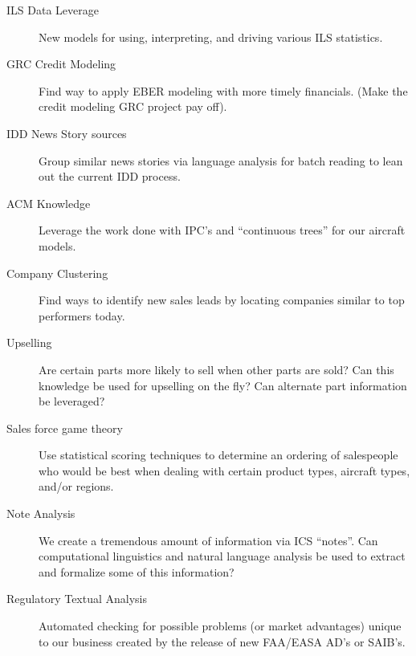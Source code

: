 \documentclass[letterpaper]{article}
\begin{document}
\begin{description}
    \item[ILS Data Leverage]
        New models for using, interpreting, and driving various ILS statistics.

    \item[GRC Credit Modeling]
        Find way to apply EBER modeling with more timely financials. (Make the
        credit modeling GRC project pay off).

    \item[IDD News Story sources]
        Group similar news stories via language analysis for batch reading to
        lean out the current IDD process.

    \item[ACM Knowledge]
        Leverage the work done with IPC's and ``continuous trees'' for our 
        aircraft models.

    \item[Company Clustering]
        Find ways to identify new sales leads by locating companies similar to
        top performers today.

    \item[Upselling]
        Are certain parts more likely to sell when other parts are sold?  Can
        this knowledge be used for upselling on the fly?  Can alternate part
        information be leveraged?

    \item[Sales force game theory]
        Use statistical scoring techniques to determine an ordering of
        salespeople who would be best when dealing with certain product types,
        aircraft types, and/or regions.

    \item[Note Analysis]
        We create a tremendous amount of information via ICS ``notes''.  Can
        computational linguistics and natural language analysis be used to
        extract and formalize some of this information?

    \item[Regulatory Textual Analysis]
        Automated checking for possible problems (or market advantages)
        unique to our business created by the release of new FAA/EASA AD's
        or SAIB's.

    \end{description}
\end{document}
